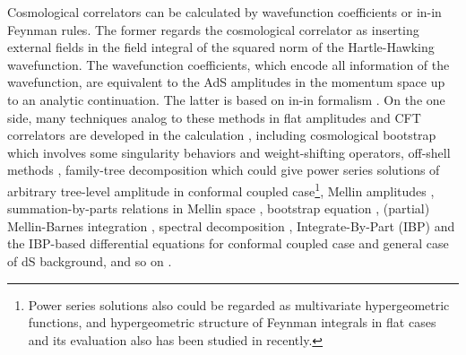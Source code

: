 \documentclass[a4paper,11pt]{article}
\begin{document}
Cosmological correlators 
can be calculated by wavefunction coefficients or in-in Feynman rules. The former regards the cosmological correlator as inserting external fields in the field integral of the squared norm of the Hartle-Hawking wavefunction. The wavefunction coefficients, which encode all information of the wavefunction, are equivalent to the AdS amplitudes in the momentum space up to an analytic continuation. The latter is based on in-in formalism \cite{Keldysh:1964ud,Schwinger:1960qe,Chou:1984es,Penrose1986QuantumCI}. On the one side, many techniques analog to these methods in flat amplitudes and CFT correlators are developed in the calculation%
, including cosmological bootstrap \cite{Arkani-Hamed:2018kmz,Baumann:2019oyu,Baumann:2020dch,Pajer:2020wnj,Hillman:2021bnk,Baumann:2021fxj,Hogervorst:2021uvp,Pimentel:2022fsc,Jazayeri:2022kjy,Wang:2022eop,Baumann:2022jpr,Chen:2023xlt} which involves some singularity behaviors and weight-shifting operators, off-shell methods \cite{Armstrong:2022mfr,Tao:2022nqc,Chen:2023bji,Werth:2024mjg}, family-tree decomposition \cite{Fan:2024iek} which could give power series solutions of arbitrary tree-level amplitude in conformal coupled case\footnote{Power series solutions also could be regarded as multivariate hypergeometric functions, and hypergeometric structure of Feynman integrals in flat cases and its evaluation also has been studied in \cite{Blumlein:2021hbq} recently.}, Mellin amplitudes \cite{Sleight:2019hfp,Sleight:2019mgd,Sleight:2020obc}, summation-by-parts relations in Mellin space \cite{Alaverdian:2024llo}, bootstrap equation \cite{Qin:2023ejc,Aoki:2024uyi},   (partial) Mellin-Barnes integration \cite{Sleight:2021plv,Jazayeri:2021fvk,Premkumar:2021mlz,Qin:2022lva,Qin:2022fbv,Qin:2023bjk}, spectral decomposition \cite{Xianyu:2022jwk,Liu:2024xyi,Loparco:2023rug} , Integrate-By-Part (IBP) \cite{Chetyrkin:1981qh} and the IBP-based differential equations \cite{Kotikov:1990kg,Kotikov:1991pm,Gehrmann:1999as,Bern:1993kr} for conformal coupled case \cite{De:2023xue,Arkani-Hamed:2023kig,He:2024olr,Benincasa:2024ptf} and general case \cite{Chen:2023iix} of dS background, and so on \cite{Mei:2023jkb,Gomez:2021qfd,Gomez:2021ujt,Arkani-Hamed:2017fdk,Arkani-Hamed:2018bjr,Lee:2022fgr,Grimm:2024tbg}. 
\end{document}
